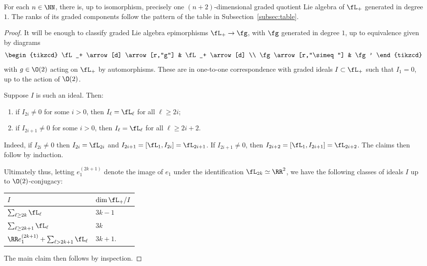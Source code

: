 \begin{lem*} For each $n \in \NN$, there is, up to isomorphism, precisely one $(n+2)$-dimensional graded quotient 
        Lie algebra of $\fL_+$ generated in degree $1$. The ranks of its graded components follow the
        pattern of the table in Subsection~\ref{subsec:table}.
\end{lem*}
\begin{proof}
It will be enough to classify graded Lie algebra epimorphisms $\fL_+ \to \fg$,
with $\fg$ generated in degree $1$, up to equivalence given by diagrams
\[\begin{tikzcd}
        \fL_+ \arrow[d] \arrow[r,"g"] & \fL_+ \arrow[d] \\
        \fg \arrow[r,"\simeq"] & \fg'
\end{tikzcd}\]
with $g \in \O(2)$ acting on $\fL_+$ by automorphisms.
These are in one-to-one correspondence with graded ideals $I \subset \fL_+$ such that $I_1 = 0$,
up to the action of $\O(2)$.

Suppose $I$ is such an ideal. Then:
\begin{enumerate}
        \item if $I_{2i}\neq0$ for some $i>0$, then $I_\ell = \fL_\ell$ for all $\ell \ge 2i$;
        \item if $I_{2i+1}\neq0$ for some $i>0$, then $I_\ell = \fL_\ell$ for all $\ell \ge 2i+2$.
\end{enumerate}
Indeed, if $I_{2i} \neq 0$ then $I_{2i} = \fL_{2i}$ and
$I_{2i+1}=[\fL_1,I_{2i}]=\fL_{2i+1}$. If $I_{2i+1} \neq 0$, then
$I_{2i+2}=[\fL_1,I_{2i+1}]=\fL_{2i+2}$. The claims then follow by induction. 

Ultimately thus, letting $e_1^{(2k+1)}$ denote the image of 
$e_1$ under the identification $\fL_{2k}\simeq \RR^2$,
we have the following classes of ideals $I$ up to $\O(2)$-conjugacy:
\begin{center}\begin{tabular}{@{}ll@{}}
        \toprule
        $I$ & $\dim\fL_+/I$ \\
        \midrule
        $\sum_{\ell \ge 2k} \fL_\ell$ & $3k-1$ \\
        $\sum_{\ell \ge 2k+1} \fL_\ell$ & $3k$ \\
        $\RR e_1^{(2k+1)} + \sum_{\ell > 2k+1} \fL_\ell$ & $3k+1$. \\ \bottomrule
\end{tabular}\end{center}
The main claim then follows by inspection.
\end{proof}

